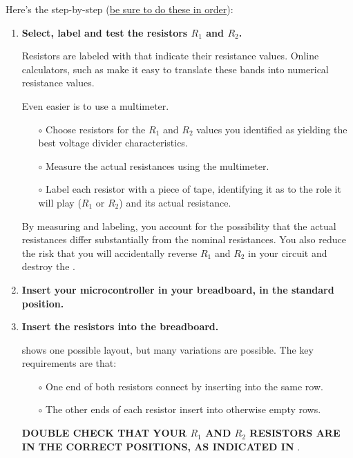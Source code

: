 Here's the step-by-step (\underline{be sure to do these in order}):
\begin{enumerate}
	\item \textbf{Select, label and test the resistors $R_1$ and $R_2$.}
	
	Resistors are labeled with  that indicate their resistance values. 
	Online calculators, such as  make it easy to translate these bands into numerical resistance values. 
	
	\smallskip
	Even easier is to use a multimeter.
	\begin{itemize}
		\item[$\circ$] Choose resistors for the $R_1$ and $R_2$ values you identified as yielding the best voltage divider characteristics.
		\item[$\circ$] Measure the actual resistances using the multimeter.
		\item[$\circ$] Label each resistor with a piece of tape, identifying it as to the role it will play ($R_1$ or $R_2$) and its actual resistance.		
	\end{itemize}
	By measuring and labeling, you account for the possibility that the actual resistances differ substantially from the nominal resistances.
	You also reduce the risk that you will accidentally reverse $R_1$ and $R_2$ in your circuit and destroy the \adc.
	
	\item \textbf{Insert your microcontroller in your breadboard, in the standard position.}	
	
	\item \textbf{Insert the resistors into the breadboard.}	
	
	 shows one possible layout, but many variations are possible.
	The key requirements are that:
	\begin{itemize}
		\item[$\circ$] One end of both resistors connect by inserting into the same row.
		\item[$\circ$] The other ends of each resistor insert into otherwise empty rows.	
	\end{itemize}
	\textbf{DOUBLE CHECK THAT YOUR $R_1$ AND $R_2$ RESISTORS ARE IN THE CORRECT POSITIONS, AS INDICATED IN }.
	

\end{enumerate}
